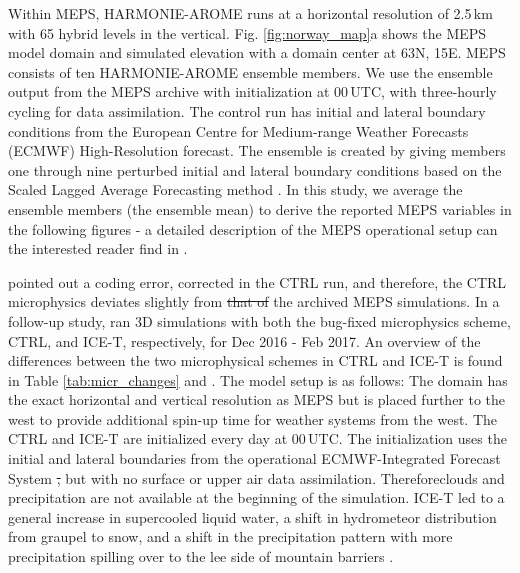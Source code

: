 \documentclass{ametsocV5}
\providecommand{\DIFadd}[1]{{\protect\color{blue}\uwave{#1}}} %
\providecommand{\DIFdel}[1]{{\protect\color{red}\sout{#1}}}                      %
\providecommand{\DIFaddbegin}{} %
\providecommand{\DIFaddend}{} %
\providecommand{\DIFdelbegin}{} %
\providecommand{\DIFdelend}{} %
\newcommand{\DIFscaledelfig}{0.5}
\newlength{\DIFdelgraphicswidth} %
\newlength{\DIFdelgraphicsheight} %
\newcommand{\DIFaddincludegraphics}[2][]{{\color{blue}\fbox{\DIFOincludegraphics[#1]{#2}}}} %
\newcommand{\DIFdelincludegraphics}[2][]{%
\sbox{\DIFdelgraphicsbox}{\DIFOincludegraphics[#1]{#2}}%
\settoboxwidth{\DIFdelgraphicswidth}{\DIFdelgraphicsbox} %
\settoboxtotalheight{\DIFdelgraphicsheight}{\DIFdelgraphicsbox} %
\scalebox{\DIFscaledelfig}{%
\parbox[b]{\DIFdelgraphicswidth}{\usebox{\DIFdelgraphicsbox}\\[-\baselineskip] \rule{\DIFdelgraphicswidth}{0em}}\llap{\resizebox{\DIFdelgraphicswidth}{\DIFdelgraphicsheight}{%
\setlength{\unitlength}{\DIFdelgraphicswidth}%
\begin{picture}(1,1)%
\thicklines\linethickness{2pt} %
{\color[rgb]{1,0,0}\put(0,0){\framebox(1,1){}}}%
{\color[rgb]{1,0,0}\put(0,0){\line( 1,1){1}}}%
{\color[rgb]{1,0,0}\put(0,1){\line(1,-1){1}}}%
\end{picture}%
}\hspace*{3pt}}} %
} %
\DeclareRobustCommand{\DIFaddbegin}{\DIFOaddbegin \let\includegraphics\DIFaddincludegraphics} %
\DeclareRobustCommand{\DIFaddend}{\DIFOaddend \let\includegraphics\DIFOincludegraphics} %
\DeclareRobustCommand{\DIFdelbegin}{\DIFOdelbegin \let\includegraphics\DIFdelincludegraphics} %
\DeclareRobustCommand{\DIFdelend}{\DIFOaddend \let\includegraphics\DIFOincludegraphics} %
\begin{document}
		Within MEPS, HARMONIE-AROME runs at a horizontal resolution of 2.5\,km with 65 hybrid levels in the vertical. Fig. \ref{fig:norway_map}a shows the MEPS model domain and simulated elevation with a domain center at 63\textdegree N, 15\textdegree E. MEPS consists of ten HARMONIE-AROME ensemble members. We use the ensemble output from the MEPS archive with initialization at 00\,UTC, with three-hourly cycling for data assimilation. The control run has initial and lateral boundary conditions from the European Centre for Medium-range Weather Forecasts (ECMWF) High-Resolution forecast. The ensemble is created by giving members one through nine perturbed initial and lateral boundary conditions based on the Scaled Lagged Average Forecasting method \citep{koltzow_metcoop_2017}. In this study, we average the ensemble members (the ensemble mean) to derive the reported MEPS variables in the following figures - a detailed description of the MEPS operational setup can the interested reader find in \citet{frogner_convection-permitting_2019}. 

	 	\citet{engdahl_effects_2020} pointed out a coding error, corrected in the CTRL run, and therefore, the CTRL microphysics deviates slightly from \DIFdelbegin \DIFdel{that of }\DIFdelend the archived MEPS simulations. In a follow-up study, \citet{engdahl_effects_2020} ran 3D simulations with both the bug-fixed microphysics scheme, CTRL, and ICE-T, respectively, for Dec 2016 - Feb 2017. An overview of the differences between the two microphysical schemes in CTRL and ICE-T is found in Table \ref{tab:micr_changes} and \citet{engdahl_improving_2020}. The \citet{engdahl_effects_2020} model setup is as follows: The domain has the exact horizontal and vertical resolution as MEPS but is placed further to the west to provide additional spin-up time for weather systems from the west. The CTRL and ICE-T are initialized every day at 00\,UTC. The initialization uses the initial and lateral boundaries from the operational ECMWF-Integrated Forecast System \DIFdelbegin \DIFdel{, }\DIFdelend but with no surface or upper air data assimilation. Therefore\DIFaddbegin \DIFadd{, }\DIFaddend clouds and precipitation are not available at the beginning of the simulation. ICE-T led to a general increase in supercooled liquid water, a shift in hydrometeor distribution from graupel to snow, and a shift in the precipitation pattern with more precipitation spilling over to the lee side of mountain barriers \citep{engdahl_effects_2020}.

		
		
\end{document}
